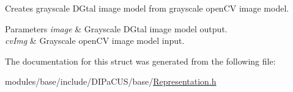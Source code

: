 Creates grayscale D\+Gtal image model from grayscale open\+CV image model. 


\begin{DoxyParams}{Parameters}
{\em image} & Grayscale D\+Gtal image model output. \\
\hline
{\em cv\+Img} & Grayscale open\+CV image model input. \\
\hline
\end{DoxyParams}


The documentation for this struct was generated from the following file\+:\begin{DoxyCompactItemize}
\item 
modules/base/include/\+D\+I\+Pa\+C\+U\+S/base/\mbox{\hyperlink{Representation_8h}{Representation.\+h}}\end{DoxyCompactItemize}
